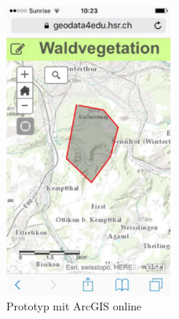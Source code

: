\begin{figure}[H]
    \centering
    \includegraphics[width=0.5\textwidth]{esriprototyp}
    \caption{Prototyp mit ArcGIS online}
    \label{fig:mesh1}
\end{figure}


